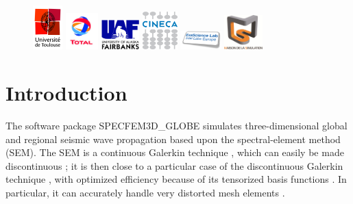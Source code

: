 \documentclass[oneside,english]{book}
\begin{document}
\begin{figure}[htbp]
\begin{centering}
\includegraphics[width=0.102\textwidth]{figures/logo_Univ_Toulouse}\vspace*{2truemm}
\includegraphics[width=0.112\textwidth]{figures/logo_TOTAL}\vspace*{2truemm}
\includegraphics[width=0.130\textwidth]{figures/logo_Fairbanks}\vspace*{2truemm}
\includegraphics[width=0.120\textwidth]{figures/logo_CINECA}\vspace*{2truemm}
\includegraphics[width=0.140\textwidth]{figures/logo_Intel_Exascale_Labs}\vspace*{2truemm}
\includegraphics[width=0.130\textwidth]{figures/logo_Maison_Simulation}
\par\end{centering}
\end{figure}

\newpage{}

\tableofcontents{}

\chapter{Introduction}

The software package SPECFEM3D\_GLOBE simulates three-dimensional
global and regional seismic wave propagation based upon the spectral-element method (SEM).
The SEM is a continuous Galerkin technique \citep{TrKoLi08,PeKoLuMaLeCaLeMaLiBlNiBaTr11},
which can easily be made discontinuous \citep{BeMaPa94,Ch00,KoWoHu02,ChCaVi03,LaWaBe05,Kop06,WiStBuGh10,AcKo11};
it is then close to a particular case of the discontinuous Galerkin technique \citep{ReHi73,LeRa74,Arn82,JoPi86,BoMaHe91,FaRi99,HuHuRa99,CoKaSh00,GiHeWa02,RiWh03,MoRi05,GrScSc06,AiMoMu06,BeLaPi06,DuKa06,DeSeWh08,PuAmKa09,WiStBuGh10,DeSe10,EtChViGl10}, with optimized efficiency because of its tensorized basis functions \citep{WiStBuGh10,AcKo11}.
In particular, it can accurately handle very distorted mesh elements \citep{OlSe11}.\\
\end{document}
